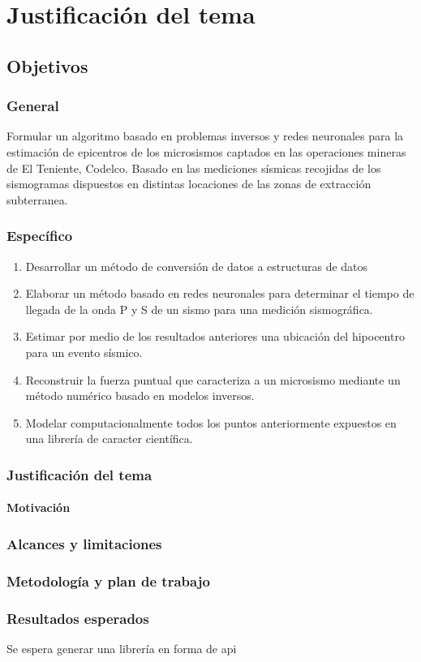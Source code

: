 \chapter{Justificación del tema} 

\section{Objetivos}

\subsection{General}

Formular un algoritmo basado en problemas inversos y redes neuronales para la
estimación de epicentros de los microsismos captados en las operaciones mineras
de El Teniente, Codelco. Basado en las mediciones sísmicas recojidas de los
sismogramas dispuestos en distintas locaciones de las zonas de extracción
subterranea.


\subsection{Específico}

\begin{enumerate}
  \item Desarrollar un método de conversión de datos a estructuras de datos
  \item Elaborar un método basado en redes neuronales para determinar el
  tiempo de llegada de la onda P y S de un sismo para una medición sismográfica.
  \item Estimar por medio de los resultados anteriores una ubicación del
  hipocentro para un evento sísmico.
  \item Reconstruir la fuerza puntual que caracteriza a un microsismo mediante
  un método numérico basado en modelos inversos.
  \item Modelar computacionalmente todos los puntos anteriormente expuestos en
  una librería de caracter científica.
\end{enumerate}


\subsection{Justificación del tema}

\subsubsection{Motivación}

\subsection{Alcances y limitaciones}

\subsection{Metodología y plan de trabajo}

\subsection{Resultados esperados}

Se espera generar una librería en forma de api

